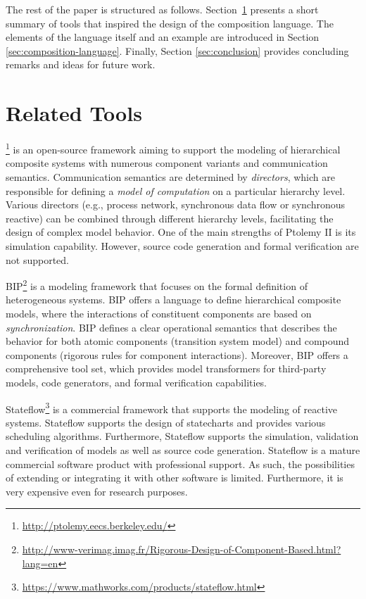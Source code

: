 The rest of the paper is structured as follows. Section~\ref{sec:related-tools} presents a short summary of tools that inspired the design of the composition language. The elements of the language itself and an example are introduced in Section \ref{sec:composition-language}. Finally, Section \ref{sec:conclusion} provides concluding remarks and ideas for future work.

\section{Related Tools}
\label{sec:related-tools}

\ptolemy\footnote{\url{http://ptolemy.eecs.berkeley.edu/}} \cite{ptolemy,ptolemy2} is an open-source framework aiming to support
the modeling of hierarchical composite systems with numerous component variants and communication semantics. Communication semantics are determined by \emph{directors}, which are responsible for defining a \emph{model of computation} on a particular hierarchy level. Various directors (e.g., process network, synchronous data flow
or synchronous reactive) can be combined through different hierarchy levels, facilitating the design of complex model behavior. One of the main strengths of Ptolemy II is its simulation capability. However, source code generation and formal verification are not supported.

BIP\footnote{\url{http://www-verimag.imag.fr/Rigorous-Design-of-Component-Based.html?lang=en}} \cite{bip,bip3} is a modeling framework that focuses on the formal definition of heterogeneous systems.
BIP offers a language to define hierarchical composite models, where the interactions of constituent components are based on \emph{synchronization}. BIP defines a clear operational semantics that describes the behavior for both atomic components (transition system model) and compound components (rigorous rules for component interactions). Moreover, BIP offers a comprehensive tool set, which provides model transformers for third-party models, code generators, and formal
verification capabilities.

Stateflow\footnote{\url{https://www.mathworks.com/products/stateflow.html}} \cite{stateflow} is a commercial framework that supports the modeling of
reactive systems. Stateflow supports the design of
statecharts and provides various scheduling
algorithms. Furthermore, Stateflow supports the simulation, validation and verification of models as well as source code generation. Stateflow is a mature commercial software product with professional
support. As such, the possibilities of extending or integrating it with other software is limited. Furthermore, it is very expensive even for research purposes.

